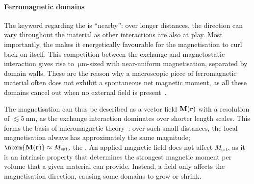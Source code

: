 \paragraph{Ferromagnetic domains}
The keyword regarding the  is ``nearby'': over longer distances, the  direction can vary throughout the material as other interactions are also at play.
Most importantly, the  makes it energetically favourable for the magnetisation to curl back on itself. %
This competition between the exchange and magnetostatic interaction gives rise to $\SI{}{\micro\metre}$-sized  with near-uniform magnetisation, separated by domain walls.
These are the reason why a macroscopic piece of ferromagnetic material often does not exhibit a spontaneous net magnetic moment, as all these domains cancel out when no external field is present~\cite{coey2010magnetism}. \par
The magnetisation can thus be described as a vector field $\boldsymbol{\mathbf{M}}(\boldsymbol{\mathbf{r}})$ with a resolution of $\lesssim \SI{5}{\nano\metre}$, as the exchange interaction dominates over shorter length scales.
This forms the basis of micromagnetic theory~\cite{mumax3}: over such small distances, the local magnetisation always has approximately the same magnitude; $\norm{\vc{M}(\vc{r})} \approx M_\mathrm{sat}$, the .
An applied magnetic field does not affect $M_\mathrm{sat}$, as it is an intrinsic property that determines the strongest magnetic moment per volume that a given material can provide.
Instead, a field only affects the magnetisation direction, causing some domains to grow or shrink.

